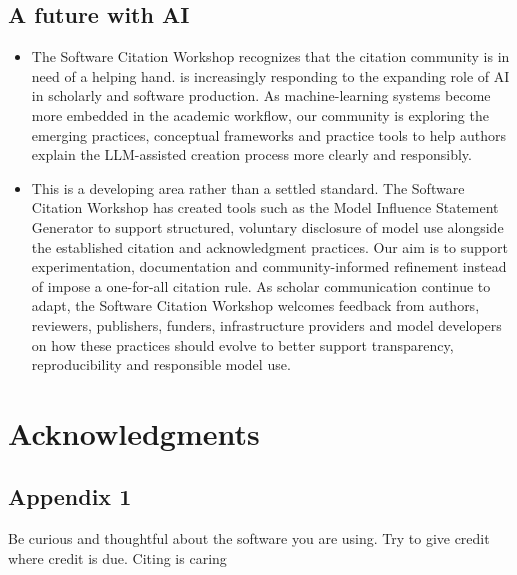 \documentclass[twocolumn]{openjournal}
\begin{document}
\subsection{A future with AI}
\begin{itemize}
    \item The Software Citation Workshop recognizes that the citation community is in need of a helping hand. is increasingly responding to the expanding role of AI in scholarly and software production. As machine-learning systems become more embedded in the academic workflow, our community is exploring the emerging practices, conceptual frameworks and practice tools to help authors explain the LLM-assisted creation process more clearly and responsibly.
\end{itemize}
\begin{itemize}
    \item This is a developing area rather than a settled standard. The Software Citation Workshop has created tools such as the Model Influence Statement Generator to support structured, voluntary disclosure of model use alongside the established citation and acknowledgment practices. Our aim is to support experimentation, documentation and community-informed refinement instead of impose a one-for-all citation rule. As scholar communication continue to adapt, the Software Citation Workshop welcomes feedback from authors, reviewers, publishers, funders, infrastructure providers and model developers on how these practices should evolve to better support transparency, reproducibility and responsible model use.
\end{itemize}
\section*{Acknowledgments}








\begin{appendix}

\section{Appendix 1}
\label{ap:ap}

Be curious and thoughtful about the software you are using. Try to give credit
where credit is due. Citing is caring
\lipsum[4]

\end{appendix}


 
\end{document}
